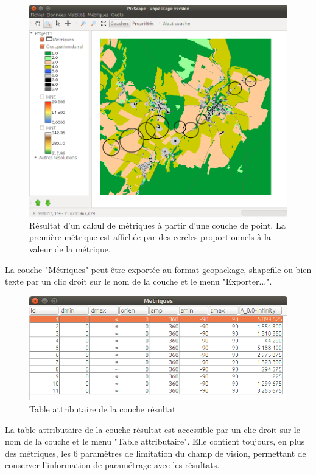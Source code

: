 \documentclass{report}
\begin{document}
\begin{figure}[H]
	\includegraphics[scale=0.5]{img/metric_result_vect-fr.png} 
	\caption{Résultat d'un calcul de métriques à partir d'une couche de point. La première métrique est affichée par des cercles proportionnels à la valeur de la métrique.}
	\label{metric_result_vect}
\end{figure}

La couche "Métriques" peut être exportée au format geopackage, shapefile ou bien texte par un clic droit sur le nom de la couche et le menu "Exporter...".

\begin{figure}[H]
	\includegraphics[scale=0.5]{img/metric_result_attr-fr.png} 
	\caption{Table attributaire de la couche résultat}
	\label{metric_result_attr}
\end{figure}

La table attributaire de la couche résultat est accessible par un clic droit sur le nom de la couche et le menu "Table attributaire". Elle contient toujours, en plus des métriques, les 6 paramètres de limitation du champ de vision, permettant de conserver l'information de paramétrage avec les résultats.
\end{document}
